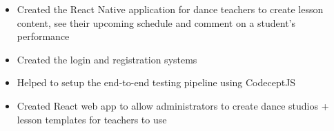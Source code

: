 \bigbreak
\begin{itemize}
    \item Created the React Native application for dance teachers to create lesson content, see their upcoming schedule and comment on a student's performance
    \item Created the login and registration systems
    \item Helped to setup the end-to-end testing pipeline using CodeceptJS
    \item Created React web app to allow administrators to create dance studios + lesson templates for teachers to use
\end{itemize}
